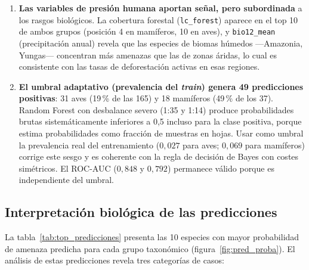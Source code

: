 \documentclass[12pt,a4paper]{article}
\begin{document}
\begin{enumerate}[label=\textbf{\arabic*.}]
  \item \textbf{Las variables de presión humana aportan señal, pero subordinada}
        a los rasgos biológicos.  La cobertura forestal (\texttt{lc\_forest}) aparece en
        el top 10 de ambos grupos (posición 4 en mamíferos, 10 en aves), y
        \texttt{bio12\_mean} (precipitación anual) revela que las especies de biomas
        húmedos ---Amazonia, Yungas--- concentran más amenazas que las de zonas áridas,
        lo cual es consistente con las tasas de deforestación activas en esas regiones.

  \item \textbf{El umbral adaptativo (prevalencia del \textit{train}) genera 49 predicciones
        positivas}: 31 aves (19\,\% de las 165) y 18 mamíferos (49\,\% de los 37).
        Random Forest con desbalance severo (1:35 y 1:14) produce probabilidades brutas
        sistemáticamente inferiores a 0,5 incluso para la clase positiva, porque estima
        probabilidades como fracción de muestras en hojas.
        Usar como umbral la prevalencia real del entrenamiento ($0{,}027$ para aves;
        $0{,}069$ para mamíferos) corrige este sesgo y es coherente con la regla de
        decisión de Bayes con costes simétricos.
        El ROC-AUC ($0{,}848$ y $0{,}792$) permanece válido porque es independiente del umbral.
\end{enumerate}

\subsection{Interpretación biológica de las predicciones}

La tabla~\ref{tab:top_predicciones} presenta las 10 especies con mayor probabilidad de amenaza
predicha para cada grupo taxonómico (figura~\ref{fig:pred_proba}).
El análisis de estas predicciones revela tres categorías de casos:
\end{document}
